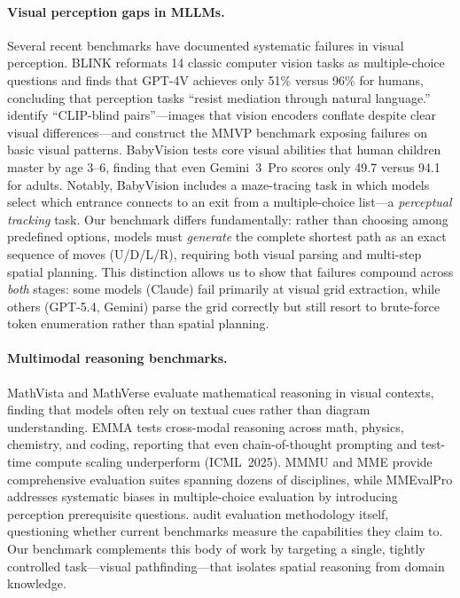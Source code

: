 \documentclass[11pt]{article}
\begin{document}
\paragraph{Visual perception gaps in MLLMs.}
Several recent benchmarks have documented systematic failures in visual perception.
BLINK \cite{fu2024blink} reformats 14 classic computer vision tasks as multiple-choice questions and finds that GPT-4V achieves only 51\% versus 96\% for humans, concluding that perception tasks ``resist mediation through natural language.''
\citet{tong2024eyes} identify ``CLIP-blind pairs''---images that vision encoders conflate despite clear visual differences---and construct the MMVP benchmark exposing failures on basic visual patterns.
BabyVision \cite{chen2026babyvision} tests core visual abilities that human children master by age 3--6, finding that even Gemini~3~Pro scores only 49.7 versus 94.1 for adults.
Notably, BabyVision includes a maze-tracing task in which models select which entrance connects to an exit from a multiple-choice list---a \emph{perceptual tracking} task.
Our benchmark differs fundamentally: rather than choosing among predefined options, models must \emph{generate} the complete shortest path as an exact sequence of moves (U/D/L/R), requiring both visual parsing and multi-step spatial planning.
This distinction allows us to show that failures compound across \emph{both} stages: some models (Claude) fail primarily at visual grid extraction, while others (GPT-5.4, Gemini) parse the grid correctly but still resort to brute-force token enumeration rather than spatial planning.

\paragraph{Multimodal reasoning benchmarks.}
MathVista \cite{lu2024mathvista} and MathVerse \cite{zhang2024mathverse} evaluate mathematical reasoning in visual contexts, finding that models often rely on textual cues rather than diagram understanding.
EMMA \cite{hao2025emma} tests cross-modal reasoning across math, physics, chemistry, and coding, reporting that even chain-of-thought prompting and test-time compute scaling underperform (ICML~2025).
MMMU \cite{yue2024mmmu} and MME \cite{fu2024mme} provide comprehensive evaluation suites spanning dozens of disciplines, while MMEvalPro \cite{huang2025mmevalpro} addresses systematic biases in multiple-choice evaluation by introducing perception prerequisite questions.
\citet{chen2024right} audit evaluation methodology itself, questioning whether current benchmarks measure the capabilities they claim to.
Our benchmark complements this body of work by targeting a single, tightly controlled task---visual pathfinding---that isolates spatial reasoning from domain knowledge.
\end{document}
